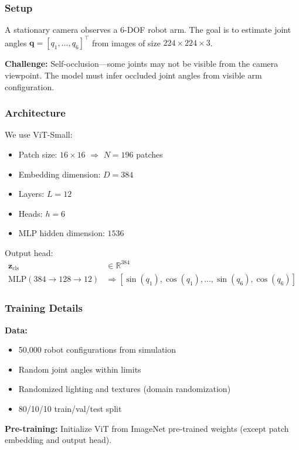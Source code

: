 \subsubsection{Setup}

A stationary camera observes a 6-DOF robot arm. The goal is to estimate joint angles $\mathbf{q} = [q_1, \ldots, q_6]^\top$ from images of size $224 \times 224 \times 3$.

\textbf{Challenge:} Self-occlusion---some joints may not be visible from the camera viewpoint. The model must infer occluded joint angles from visible arm configuration.

\subsubsection{Architecture}

We use ViT-Small:
\begin{itemize}
    \item Patch size: $16 \times 16$ $\Rightarrow$ $N = 196$ patches
    \item Embedding dimension: $D = 384$
    \item Layers: $L = 12$
    \item Heads: $h = 6$
    \item MLP hidden dimension: $1536$
\end{itemize}

Output head:
\begin{align}
\mathbf{z}_{\text{cls}} &\in \mathbb{R}^{384} \\
\text{MLP}(384 \rightarrow 128 \rightarrow 12) &\Rightarrow [\sin(q_1), \cos(q_1), \ldots, \sin(q_6), \cos(q_6)]
\end{align}

\subsubsection{Training Details}

\textbf{Data:}
\begin{itemize}
    \item 50,000 robot configurations from simulation
    \item Random joint angles within limits
    \item Randomized lighting and textures (domain randomization)
    \item 80/10/10 train/val/test split
\end{itemize}

\textbf{Pre-training:} Initialize ViT from ImageNet pre-trained weights (except patch embedding and output head).

